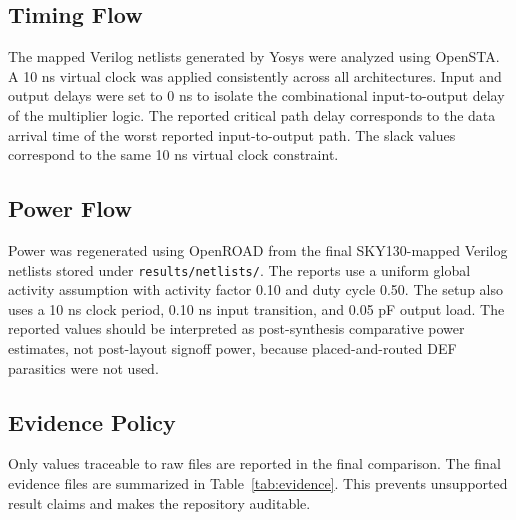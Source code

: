 \documentclass[conference]{IEEEtran}
\begin{document}
\subsection{Timing Flow}
The mapped Verilog netlists generated by Yosys were analyzed using OpenSTA. A 10 ns virtual clock was applied consistently across all architectures. Input and output delays were set to 0 ns to isolate the combinational input-to-output delay of the multiplier logic. The reported critical path delay corresponds to the data arrival time of the worst reported input-to-output path. The slack values correspond to the same 10 ns virtual clock constraint.

\subsection{Power Flow}
Power was regenerated using OpenROAD from the final SKY130-mapped Verilog netlists stored under \texttt{results/netlists/}. The reports use a uniform global activity assumption with activity factor 0.10 and duty cycle 0.50. The setup also uses a 10 ns clock period, 0.10 ns input transition, and 0.05 pF output load. The reported values should be interpreted as post-synthesis comparative power estimates, not post-layout signoff power, because placed-and-routed DEF parasitics were not used.

\subsection{Evidence Policy}
Only values traceable to raw files are reported in the final comparison. The final evidence files are summarized in Table~\ref{tab:evidence}. This prevents unsupported result claims and makes the repository auditable.

\begin{table}[t]
\centering
\caption{Raw Evidence Files for Final PPA Results}
\label{tab:evidence}
\scriptsize
{}
\end{table}
\end{document}

